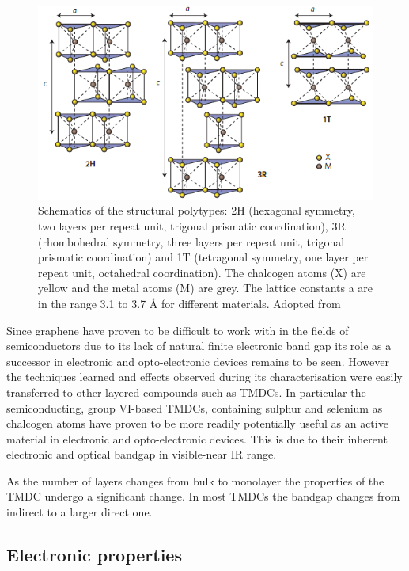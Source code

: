 	\begin{figure}[h]
	\begin{center}
	\includegraphics[scale=0.7]{TMDCPolytypes.png}
	\caption{Schematics of the structural polytypes: 2H (hexagonal symmetry, two layers per repeat unit, trigonal prismatic coordination), 3R (rhombohedral symmetry, three layers per repeat unit, trigonal prismatic coordination) and 1T (tetragonal symmetry, one layer per repeat unit, octahedral coordination). The chalcogen atoms (X) are yellow and the metal atoms (M) are grey. The lattice constants a are in the range 3.1 to 3.7 \r{A} for different materials. Adopted from \cite{ElectronicsAndOptoelectronicsOfTwo-dimensionalTransitionMetalDichalcogenides}}
	\label{fig:TMDCPolytypes}
	\end{center}
	\end{figure}
	
	Since graphene have proven to be difficult to work with in the fields of semiconductors due to its lack of natural finite electronic band gap its role as a successor in electronic and opto-electronic devices remains to be seen. However the techniques learned and effects observed during its characterisation were easily transferred to other layered compounds such as TMDCs. In particular the semiconducting, group VI-based TMDCs, containing sulphur and selenium as chalcogen atoms have proven to be more readily potentially useful as an active material in electronic and opto-electronic devices. This is due to their inherent electronic and optical bandgap in visible-near IR range. 
	
	As the number of layers changes from bulk to monolayer the properties of the TMDC undergo a significant change. In most TMDCs the bandgap changes from indirect to a larger direct one. 
	
\subsection{Electronic properties}
	\label{subsec:Electronic properties}
	
